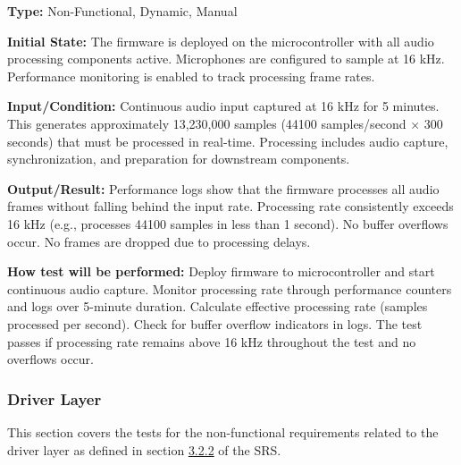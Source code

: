 \documentclass[12pt, titlepage]{article}
\begin{document}
\begin{enumerate}
\textbf{Type:} Non-Functional, Dynamic, Manual
					
\textbf{Initial State:} 
The firmware is deployed on the microcontroller with all audio processing
components active. Microphones are configured to sample at 16 kHz. Performance
monitoring is enabled to track processing frame rates.
					
\textbf{Input/Condition:} 
Continuous audio input captured at 16 kHz for 5 minutes. This generates
approximately 13,230,000 samples (44100 samples/second × 300 seconds) that must
be processed in real-time. Processing includes audio capture, synchronization,
and preparation for downstream components.
					
\textbf{Output/Result:} 
Performance logs show that the firmware processes all audio frames without
falling behind the input rate. Processing rate consistently exceeds 16 kHz
(e.g., processes 44100 samples in less than 1 second). No buffer overflows
occur. No frames are dropped due to processing delays.
					
\textbf{How test will be performed:} 
Deploy firmware to microcontroller and start continuous audio capture. Monitor
processing rate through performance counters and logs over 5-minute duration.
Calculate effective processing rate (samples processed per second). Check for
buffer overflow indicators in logs. The test passes if processing rate remains
above 16 kHz throughout the test and no overflows occur.

\end{enumerate}

\subsubsection{Driver Layer}

This section covers the tests for the non-functional requirements related to the
driver layer as defined in section \hyperref[SRS-sec:FR2]{3.2.2} of the SRS.
\end{document}
